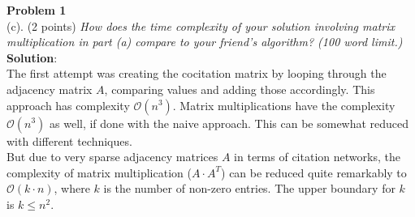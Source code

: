 \textbf{Problem 1}\\
(c). (2 points) \textsl{How does the time complexity of your solution involving matrix multiplication in part (a) compare to your friend's algorithm? (100 word limit.)}\\

\textbf{Solution}:\\
The first attempt was creating the cocitation matrix by looping through the adjacency matrix $A$, comparing values and adding those accordingly. This approach has complexity $\mathcal{O}(n^3)$. Matrix multiplications have the complexity $\mathcal{O}(n^3)$ as well, if done with the naive approach. This can be somewhat reduced with different techniques.\\

But due to very sparse adjacency matrices $A$ in terms of citation networks, the complexity of matrix multiplication ($A \cdot A^T$) can be reduced quite remarkably to $\mathcal{O}(k \cdot n)$, where $k$ is the number of non-zero entries.\cite{sparse_matrix} The upper boundary for $k$ is $k \leq n^2$.\\